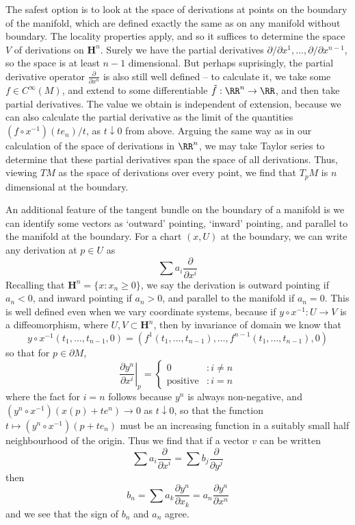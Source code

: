 The safest option is to look at the space of derivations at points on the boundary of the manifold, which are defined exactly the same as on any manifold without boundary. The locality properties apply, and so it suffices to determine the space $V$ of derivations on $\mathbf{H}^n$. Surely we have the partial derivatives $\partial/\partial x^1, \dots, \partial / \partial x^{n-1}$, so the space is at least $n-1$ dimensional. But perhaps suprisingly, the partial derivative operator $\frac{\partial}{\partial x^n}$ is also still well defined -- to calculate it, we take some $f \in C^\infty(M)$, and extend to some differentiable $\tilde{f}: \RR^n \to \RR$, and then take partial derivatives. The value we obtain is independent of extension, because we can also calculate the partial derivative as the limit of the quantities $(f \circ x^{-1})(te_n)/t$, as $t \downarrow 0$ from above. Arguing the same way as in our calculation of the space of derivations in $\RR^n$, we may take Taylor series to determine that these partial derivatives span the space of all derivations. Thus, viewing $TM$ as the space of derivations over every point, we find that $T_pM$ is $n$ dimensional at the boundary.

An additional feature of the tangent bundle on the boundary of a manifold is we can identify some vectors as `outward' pointing, `inward' pointing, and parallel to the manifold at the boundary. For a chart $(x,U)$ at the boundary, we can write any derivation at $p \in U$ as
%
\[ \sum a_i \frac{\partial}{\partial x^i} \]
%
Recalling that $\mathbf{H}^n = \{ x: x_n \geq 0 \}$, we say the derivation is outward pointing if $a_n < 0$, and inward pointing if $a_n > 0$, and parallel to the manifold if $a_n = 0$. This is well defined even when we vary coordinate systems, because if $y \circ x^{-1}: U \to V$ is a diffeomorphism, where $U,V \subset \mathbf{H}^n$, then by invariance of domain we know that
%
\[ y \circ x^{-1}(t_1, \dots, t_{n-1}, 0) = (f^1(t_1, \dots, t_{n-1}), \dots, f^{n-1}(t_1, \dots, t_{n-1}), 0) \]
%
so that for $p \in \partial M$,
%
\[ \left.\frac{\partial y^n}{\partial x^i}\right|_p = \begin{cases} 0 &: i \neq n \\ \text{positive} &: i = n \end{cases} \]
%
where the fact for $i = n$ follows because $y^n$ is always non-negative, and $(y^n \circ x^{-1})(x(p) + te^n) \to 0$ as $t \downarrow 0$, so that the function $t \mapsto (y^n \circ x^{-1})(p + te_n)$ must be an increasing function in a suitably small half neighbourhood of the origin. Thus we find that if a vector $v$ can be written
%
\[ \sum a_i \frac{\partial}{\partial x^i} = \sum b_j \frac{\partial}{\partial y^j} \]
%
then
%
\[ b_n = \sum a_k \frac{\partial y^n}{\partial x_k} = a_n \frac{\partial y^n}{\partial x^n} \]
%
and we see that the sign of $b_n$ and $a_n$ agree.

